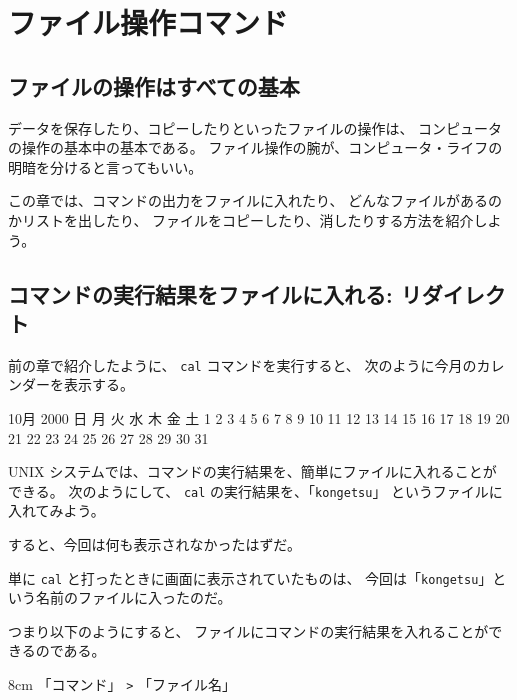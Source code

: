 \chapter{ファイル操作コマンド}

\section*{ファイルの操作はすべての基本}

データを保存したり、コピーしたりといったファイルの操作は、
コンピュータの操作の基本中の基本である。
ファイル操作の腕が、コンピュータ・ライフの明暗を分けると言ってもいい。

この章では、コマンドの出力をファイルに入れたり、
どんなファイルがあるのかリストを出したり、
ファイルをコピーしたり、消したりする方法を紹介しよう。

\section{コマンドの実行結果をファイルに入れる: リダイレクト}

前の章で紹介したように、 \texttt{cal} コマンドを実行すると、
次のように今月のカレンダーを表示する。

\begin{progls}
     10月 2000
日 月 火 水 木 金 土
 1  2  3  4  5  6  7
 8  9 10 11 12 13 14
15 16 17 18 19 20 21
22 23 24 25 26 27 28
29 30 31

%
\end{progls}

\bigskip

 UNIX システムでは、コマンドの実行結果を、簡単にファイルに入れることが
できる。
次のようにして、 \texttt{cal} の実行結果を、「\texttt{kongetsu}」
というファイルに入れてみよう。

\begin{progls}
%
\end{progls}

すると、今回は何も表示されなかったはずだ。

単に \texttt{cal} と打ったときに画面に表示されていたものは、
今回は「\texttt{kongetsu}」という名前のファイルに入ったのだ。


つまり以下のようにすると、
ファイルにコマンドの実行結果を入れることができるのである。

\begin{coml}{8cm}
「コマンド」 \verb+>+ 「ファイル名」
\end{coml}


